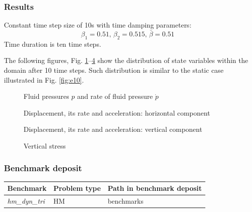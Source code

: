 \subsubsection*{Results}
Constant time step size of 10s with time damping parameters:
  \[\beta_1=0.51,\,\beta_2=0.515,\,\bar\beta=0.51\]
Time duration is ten time steps.

The following figures, Fig. \ref{fig_dynHM1}--\ref{fig_dynHM4} show the distribution of state variables within the domain after 10 time steps. Such distribution is similar
 to the static case illustrated in Fig. \ref{fig:e10}.
\begin{figure}[!htb]
  \begin{center}
  \end{center}
  \caption{Fluid pressures $p$ and rate of fluid pressure $\dot p$ }
  \label{fig_dynHM1}
\end{figure}
\begin{figure}[!htb]
  \begin{center}
  \end{center}
  \caption{Displacement, its rate and acceleration: horizontal component}
  \label{fig_dynHM2}
\end{figure}
\begin{figure}[!htb]
  \begin{center}
  \end{center}
  \caption{Displacement, its rate and acceleration: vertical component}
  \label{fig_dynHM3}
\end{figure}
\begin{figure}[!htb]
  \begin{center}
  \end{center}
  \caption{Vertical stress}
  \label{fig_dynHM4}
\end{figure}
\subsubsection*{Benchmark deposit}
\begin{tabular}{|l|l|l|}
  \hline
  Benchmark & Problem type & Path in benchmark deposit \\
  \hline
 \emph{hm\_dyn\_tri}& HM & benchmarks\verb \HM\ \\
  \hline
\end{tabular}

